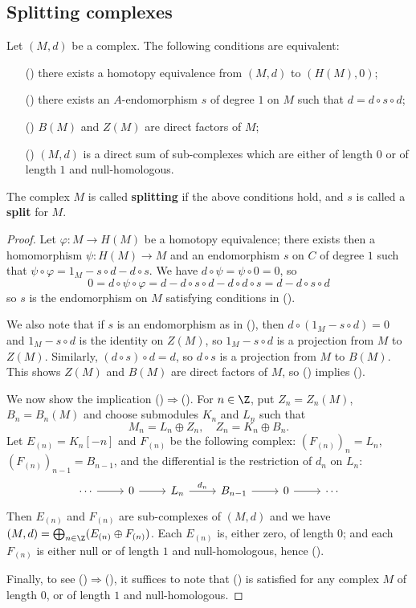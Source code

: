 \subsection{Splitting complexes}
\begin{proposition}\label{module complex splitting iff}
Let $(M,d)$ be a complex. The following conditions are equivalent:
\begin{itemize}
\item[(\rmnum{1})] there exists a homotopy equivalence from $(M,d)$ to $(H(M),0)$;
\item[(\rmnum{2})] there exists an $A$-endomorphism $s$ of degree $1$ on $M$ such that $d=d\circ s\circ d$;
\item[(\rmnum{3})] $B(M)$ and $Z(M)$ are direct factors of $M$;
\item[(\rmnum{4})] $(M,d)$ is a direct sum of sub-complexes which are either of length $0$ or of length $1$ and null-homologous.
\end{itemize}
The complex $M$ is called \textbf{splitting} if the above conditions hold, and $s$ is called a \textbf{split} for $M$. 
\end{proposition}
\begin{proof}
Let $\varphi:M\to H(M)$ be a homotopy equivalence; there exists then a homomorphism $\psi:H(M)\to M$ and an endomorphism $s$ on $C$ of degree $1$ such that $\psi\circ\varphi=1_M-s\circ d-d\circ s$. We have $d\circ\psi=\psi\circ 0=0$, so
\[0=d\circ\psi\circ\varphi=d-d\circ s\circ d-d\circ d\circ s=d-d\circ s\circ d\]
so $s$ is the endomorphism on $M$ satisfying conditions in ().\par
We also note that if $s$ is an endomorphism as in (), then $d\circ(1_M-s\circ d)=0$ and $1_M-s\circ d$ is the identity on $Z(M)$, so $1_M-s\circ d$ is a projection from $M$ to $Z(M)$. Similarly, $(d\circ s)\circ d=d$, so $d\circ s$ is a projection from $M$ to $B(M)$. This shows $Z(M)$ and $B(M)$ are direct factors of $M$, so () implies ().\par
We now show the implication ()$\Rightarrow$(). For $n\in\Z$, put $Z_n=Z_n(M)$, $B_n=B_n(M)$ and choose submodules $K_n$ and $L_n$ such that
\[M_n=L_n\oplus Z_n,\quad Z_n=K_n\oplus B_n.\]
Let $E_{(n)}=K_n[-n]$ and $F_{(n)}$ be the following complex: $(F_{(n)})_n=L_n$, $(F_{(n)})_{n-1}=B_{n-1}$, and the differential is the restriction of $d_n$ on $L_n$:
\[\begin{tikzcd}
\cdots\ar[r]&0\ar[r]&L_n\ar[r,"d_n"]&B_{n-1}\ar[r]&0\ar[r]&\cdots
\end{tikzcd}\]
Then $E_{(n)}$ and $F_{(n)}$ are sub-complexes of $(M,d)$ and we have $(M,d)=\bigoplus_{n\in\Z}(E_{(n)}\oplus F_{(n)})$. Each $E_{(n)}$ is, either zero, of length $0$; and each $F_{(n)}$ is either null or of length $1$ and null-homologous, hence ().\par
Finally, to see ()$\Rightarrow$(), it suffices to note that () is satisfied for any complex $M$ of length $0$, or of length $1$ and null-homologous.
\end{proof}
